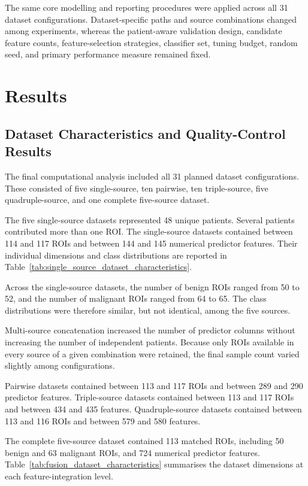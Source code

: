 \documentclass[12pt,twocolumn]{article}
\begin{document}
The same core modelling and reporting procedures were applied across
all 31 dataset configurations. Dataset-specific paths and source
combinations changed among experiments, whereas the patient-aware
validation design, candidate feature counts, feature-selection
strategies, classifier set, tuning budget, random seed, and primary
performance measure remained fixed.





\section{Results}
\label{sec:results}

\subsection{Dataset Characteristics and Quality-Control Results}
\label{subsec:results_dataset_characteristics}

The final computational analysis included all 31 planned dataset
configurations. These consisted of five single-source, ten pairwise,
ten triple-source, five quadruple-source, and one complete five-source
dataset.

The five single-source datasets represented 48 unique patients. Several
patients contributed more than one ROI. The single-source datasets
contained between 114 and 117 ROIs and between 144 and 145 numerical
predictor features. Their individual dimensions and class distributions
are reported in Table~\ref{tab:single_source_dataset_characteristics}.

Across the single-source datasets, the number of benign ROIs ranged
from 50 to 52, and the number of malignant ROIs ranged from 64 to 65.
The class distributions were therefore similar, but not identical,
among the five sources.

Multi-source concatenation increased the number of predictor columns
without increasing the number of independent patients. Because only
ROIs available in every source of a given combination were retained,
the final sample count varied slightly among configurations.

Pairwise datasets contained between 113 and 117 ROIs and between 289
and 290 predictor features. Triple-source datasets contained between
113 and 117 ROIs and between 434 and 435 features. Quadruple-source
datasets contained between 113 and 116 ROIs and between 579 and 580
features.

The complete five-source dataset contained 113 matched ROIs, including
50 benign and 63 malignant ROIs, and 724 numerical predictor features.
Table~\ref{tab:fusion_dataset_characteristics} summarises the dataset
dimensions at each feature-integration level.
\end{document}
